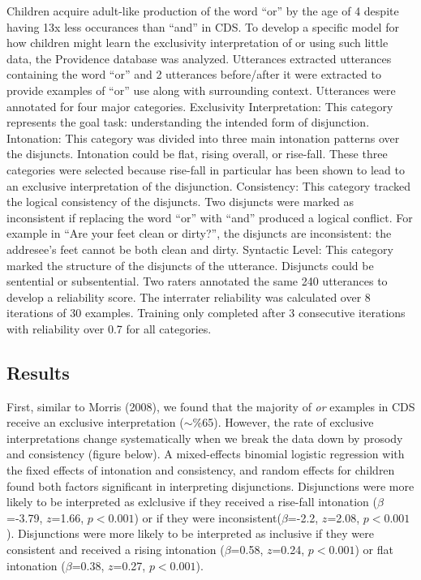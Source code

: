 \documentclass[10pt, letterpaper]{article}
\begin{document}
Children acquire adult-like production of the word ``or'' by the age of
4 despite having 13x less occurances than ``and'' in CDS. To develop a
specific model for how children might learn the exclusivity
interpretation of or using such little data, the Providence database was
analyzed. Utterances extracted utterances containing the word ``or'' and
2 utterances before/after it were extracted to provide examples of
``or'' use along with surrounding context. Utterances were annotated for
four major categories. Exclusivity Interpretation: This category
represents the goal task: understanding the intended form of
disjunction. Intonation: This category was divided into three main
intonation patterns over the disjuncts. Intonation could be flat, rising
overall, or rise-fall. These three categories were selected because
rise-fall in particular has been shown to lead to an exclusive
interpretation of the disjunction. Consistency: This category tracked
the logical consistency of the disjuncts. Two disjuncts were marked as
inconsistent if replacing the word ``or'' with ``and'' produced a
logical conflict. For example in ``Are your feet clean or dirty?'', the
disjuncts are inconsistent: the addresee's feet cannot be both clean and
dirty. Syntactic Level: This category marked the structure of the
disjuncts of the utterance. Disjuncts could be sentential or
subsentential. Two raters annotated the same 240 utterances to develop a
reliability score. The interrater reliability was calculated over 8
iterations of 30 examples. Training only completed after 3 consecutive
iterations with reliability over 0.7 for all categories.

\subsection{Results}\label{results-1}

First, similar to Morris (2008), we found that the majority of \emph{or}
examples in CDS receive an exclusive interpretation (\(\sim\)\%65).
However, the rate of exclusive interpretations change systematically
when we break the data down by prosody and consistency (figure below). A
mixed-effects binomial logistic regression with the fixed effects of
intonation and consistency, and random effects for children found both
factors significant in interpreting disjunctions. Disjunctions were more
likely to be interpreted as exlclusive if they received a rise-fall
intonation (\(\beta\)=-3.79, \(z\)=1.66, \(p < 0.001\)) or if they were
inconsistent(\(\beta\)=-2.2, \(z\)=2.08, \(p < 0.001\)). Disjunctions
were more likely to be interpreted as inclusive if they were consistent
and received a rising intonation (\(\beta\)=0.58, \(z\)=0.24,
\(p < 0.001\)) or flat intonation (\(\beta\)=0.38, \(z\)=0.27,
\(p < 0.001\)).
\end{document}
